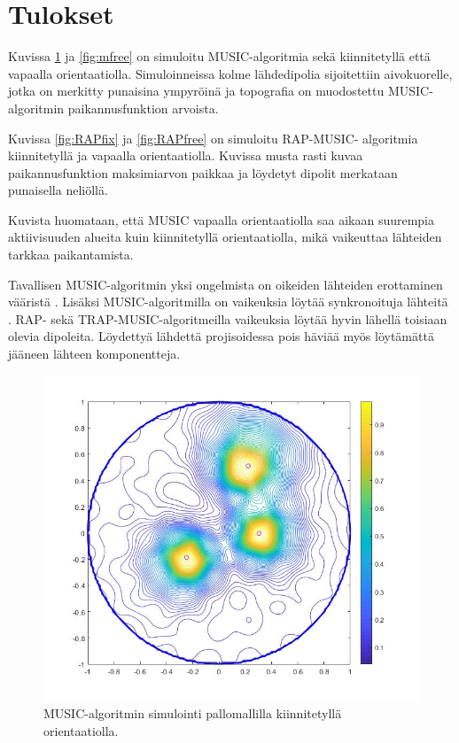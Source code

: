 \section{Tulokset}

Kuvissa \ref{fig:mfix} ja \ref{fig:mfree} on simuloitu MUSIC-algoritmia sekä kiinnitetyllä että vapaalla orientaatiolla. Simuloinneissa kolme lähdedipolia sijoitettiin aivokuorelle, jotka on merkitty punaisina ympyröinä ja topografia on muodostettu MUSIC-algoritmin paikannusfunktion arvoista.

Kuvissa \ref{fig:RAPfix} ja \ref{fig:RAPfree} on simuloitu RAP-MUSIC- algoritmia kiinnitetyllä ja vapaalla orientaatiolla. Kuvissa musta rasti kuvaa paikannusfunktion maksimiarvon paikkaa ja löydetyt dipolit merkataan punaisella neliöllä.

Kuvista huomataan, että MUSIC vapaalla orientaatiolla saa aikaan suurempia aktiivisuuden alueita kuin kiinnitetyllä orientaatiolla, mikä vaikeuttaa lähteiden tarkkaa paikantamista. 

Tavallisen MUSIC-algoritmin yksi ongelmista on oikeiden lähteiden erottaminen vääristä \citep{Mosher1998RecursiveLocalization}. Lisäksi MUSIC-algoritmilla on vaikeuksia löytää synkronoituja lähteitä \citep{Mosher1999SourceMUSIC}. RAP- sekä TRAP-MUSIC-algoritmeilla vaikeuksia löytää hyvin lähellä toisiaan olevia dipoleita. Löydettyä lähdettä projisoidessa pois häviää myös löytämättä jääneen lähteen komponentteja.

\clearpage
\begin{figure}[h]
    \centering
    \includegraphics[scale=0.38]{mfix.jpg}
    \caption{MUSIC-algoritmin simulointi pallomallilla kiinnitetyllä orientaatiolla.}
    \label{fig:mfix}
\end{figure}


